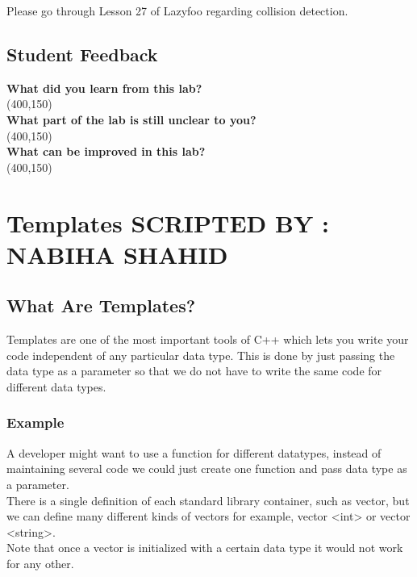 \documentclass[11pt,fleqn]{book} %
\begin{document}
 \begin{tcolorbox}[width=\textwidth,colback={white},title={KEYNOTE},colbacktitle=purple!50!white,coltitle=black] 
 	Please go through Lesson 27 of Lazyfoo regarding collision detection.
 \end{tcolorbox}
 
 \newpage
 \section{Student Feedback}
 \textbf{What did you learn from this lab?}\\ 
 \framebox(400,150){}\\
 \textbf{What part of the lab is still unclear to you?}\\
 \framebox(400,150){}\\
 \textbf{What can be improved in this lab?}\\ 
 \framebox(400,150){}\\

\newpage
{} %
\chapter{Templates \hspace{65mm} {\textsc{\small SCRIPTED BY : NABIHA SHAHID}}}

\section{What Are Templates?}

 Templates are one of the most important tools of C++ which lets you write your code independent of any particular data type. This is done by just passing the data type as a parameter so that we do not have to write the same code for different data types.
 
\subsection{Example}
A developer might want to use a function for different datatypes, instead of maintaining several code we could just create one function and pass data type as a parameter.\\
There is a single definition of each standard library container, such as vector, but we can define many different kinds of vectors for example, vector <int> or vector <string>.\\
Note that once a vector is initialized with a certain data type it would not work for any other.
\end{document}
